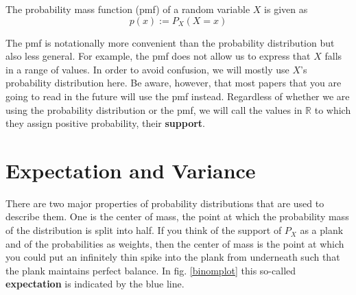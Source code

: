 \documentclass[a4paper,11pt,leqno]{report}
\begin{document}
\begin{Definition}
The probability mass function (pmf) of a random variable $ X $ is given as
$$ p(x) := P_{X}(X = x) $$
\end{Definition}

The pmf is notationally more convenient than the probability distribution but also less general. For example, the pmf does not
allow us to express that $ X $ falls in a range of values. In order to avoid confusion, we will mostly use $ X $'s 
probability distribution here. Be aware, however, that most papers that you are going to read in the future will use the pmf
instead. Regardless of whether we are using the probability distribution or the pmf, we will call the values in $ \mathbb{R} $
to which they assign positive probability, their \textbf{support}.



\section{Expectation and Variance}

There are two major properties of probability distributions that are used to describe them. One is the center of mass, the point
at which the probability mass of the distribution is split into half. If you think of the support of $ P_{X} $ as a plank and 
of the probabilities as weights, then the center of mass is the point at which you could put an infinitely thin spike into the
plank from underneath such that the plank maintains perfect balance. In fig. \ref{binomplot} this so-called \textbf{expectation}
is indicated by the blue line.
\end{document}
